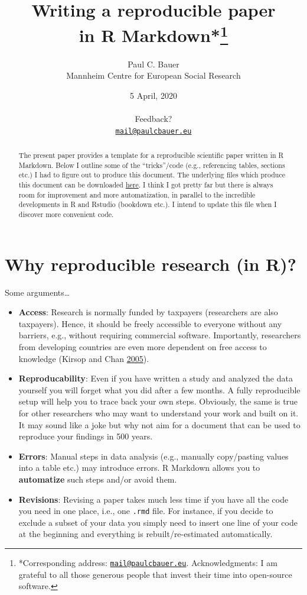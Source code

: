 \documentclass[
  12pt,
]{article}
\title{\vspace{1cm}Writing a reproducible paper\\
in R Markdown*\footnote{*Corresponding address: \href{mailto:mail@paulcbauer.eu}{\nolinkurl{mail@paulcbauer.eu}}. Acknowledgments: I am grateful to all those generous people that invest their time into open-source software.}\vspace{0.5cm}\\}
\author{Paul C. Bauer\\
Mannheim Centre for European Social Research}
\date{5 April, 2020\\
~\\
Feedback?\\
\href{mailto:mail@paulcbauer.eu}{\nolinkurl{mail@paulcbauer.eu}}\\}
\providecommand{\tightlist}{%
  \setlength{\itemsep}{0pt}\setlength{\parskip}{0pt}}
\begin{document}
\maketitle
\begin{abstract}
\noindent{}The present paper provides a template for a reproducible scientific paper written in R Markdown. Below I outline some of the ``tricks''/code (e.g., referencing tables, sections etc.) I had to figure out to produce this document. The underlying files which produce this document can be downloaded \href{https://drive.google.com/drive/folders/1zJP3cNPrHN-gj0rcmbHQgg-XA0hqDXdd?usp=sharing}{here}. I think I got pretty far but there is always room for improvement and more automatization, in parallel to the incredible developments in R and Rstudio (bookdown etc.). I intend to update this file when I discover more convenient code.\vspace{.8cm}
\end{abstract}

\clearpage

\renewcommand{\baselinestretch}{0.5}\normalsize
\tableofcontents
\renewcommand{\baselinestretch}{1.1}\normalsize

\clearpage

\hypertarget{why-reproducible-research-in-r}{%
\section{Why reproducible research (in R)?}\label{why-reproducible-research-in-r}}

Some arguments\ldots{}

\begin{itemize}
\tightlist
\item
  \textbf{Access}: Research is normally funded by taxpayers (researchers are also taxpayers). Hence, it should be freely accessible to everyone without any barriers, e.g., without requiring commercial software. Importantly, researchers from developing countries are even more dependent on free access to knowledge (Kirsop and Chan \protect\hyperlink{ref-Kirsop2005-ro}{2005}).
\item
  \textbf{Reproducability}: Even if you have written a study and analyzed the data yourself you will forget what you did after a few months. A fully reproducible setup will help you to trace back your own steps. Obviously, the same is true for other researchers who may want to understand your work and built on it. It may sound like a joke but why not aim for a document that can be used to reproduce your findings in 500 years.
\item
  \textbf{Errors}: Manual steps in data analysis (e.g., manually copy/pasting values into a table etc.) may introduce errors. R Markdown allows you to \textbf{automatize} such steps and/or avoid them.
\item
  \textbf{Revisions}: Revising a paper takes much less time if you have all the code you need in one place, i.e., one \texttt{.rmd} file. For instance, if you decide to exclude a subset of your data you simply need to insert one line of your code at the beginning and everything is rebuilt/re-estimated automatically.
\end{itemize}
\end{document}
